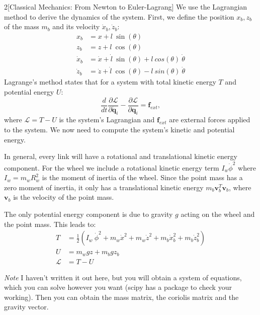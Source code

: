 \documentclass{article}
\newcommand{\vq}{\mathbf{q}}
\newcommand{\vqdot}{\mathbf{\dot{q}}}
\newcommand{\vv}{\mathbf{v}}
\newcommand{\vf}{\mathbf{f}}
\begin{document}
\begin{multicols}{2}[Classical Mechanics: From Newton to Euler-Lagrang]
We use the Lagrangian method to derive the dynamics of the system.
First, we define the position $x_b, z_b$ of the mass $m_b$ and its velocity $\dot{x}_b, \dot{z}_b$:
% 
\begin{align}
    x_b &= x + l\ \sin(\theta) \\
    z_b &= z + l\ \cos(\theta) \nonumber \\
    \dot{x}_b &= \dot{x} + \dot{l}\ \sin(\theta) +
        l\ cos(\theta)\ \dot{\theta} \nonumber \\
    \dot{z}_b &= \dot{z} + \dot{l}\ \cos(\theta) -
        l\ sin(\theta)\ \dot{\theta} \nonumber
\end{align}
% 
Lagrange's method states that for a system with total kinetic energy $T$ and potential energy $U$:
% 
\vskip 0.1in
\begin{equation} \label{eq:lagrange}
    \frac{d}{dt} \frac{\partial \mathcal{L}}{\partial \vqdot_i} - \frac{\partial \mathcal{L}}{\partial \vq_i} = \vf_{ext},
\end{equation}
\vskip 0.1in
% 
where $\mathcal{L} = T - U$ is the system's Lagrangian and $\vf_{ext}$ are external forces applied to the system. We now need to compute the system's kinetic and potential energy.

In general, every link will have a rotational and translational kinetic energy component. For the wheel we include a rotational kinetic energy term $I_w \dot{\phi}^2$ where $I_w = m_w R_w^2$ is the moment of inertia of the wheel. Since the point mass has a zero moment of inertia, it only has a translational kinetic energy $m_b \vv_b^T \vv_b$, where $\vv_b$ is the velocity of the point mass.

The only potential energy component is due to gravity $g$ acting on the wheel and the point mass. This leads to:
% 
\begin{align} \label{eq:energy1}
    T &= \frac{1}{2}(I_w \ \dot{\phi}^2 + m_w \dot{x}^2 +
        m_w \dot{z}^2 + m_b \dot{x}_b^2 + m_b \dot{z}_b^2) \\
    U &= m_w g z + m_b g z_b \label{eq:energy2} \\
    \mathcal{L} &= T - U \label{eq:energy3}
\end{align}

\textit{Note} I haven't written it out here, but you will obtain a system of equations, which you can solve however you want (scipy has a package to check your working). Then you can obtain the mass matrix, the coriolis matrix and the gravity vector.



\end{multicols}
\end{document}
